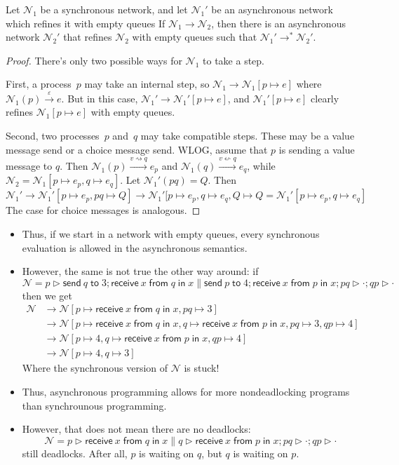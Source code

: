 \documentclass{lecturenotes}
\newcommand{\send}[2]{\ensuremath{\textsf{send}~#1 \mathrel{\textsf{to}} #2}}
\newcommand{\recv}[3]{\ensuremath{\textsf{receive}~#1 \mathrel{\textsf{from}} #2 \mathrel{\textsf{in}} #3}}
\newcommand{\senda}[2]{#1 \rightsquigarrow #2}
\newcommand{\recva}[2]{#1 \leftsquigarrow #2}
\begin{document}
\begin{thm}
  Let $\mathcal{N}_1$ be a synchronous network, and let $\mathcal{N}_1'$ be an asynchronous network which refines it with empty queues
  If $\mathcal{N}_1 \to \mathcal{N}_2$, then there is an asynchronous network $\mathcal{N}_2'$ that refines $\mathcal{N}_2$ with empty queues  such that $\mathcal{N}_1' \to^\ast \mathcal{N}_2'$.
\end{thm}
\begin{proof}
  There's only two possible ways for $\mathcal{N}_1$ to take a step.

  First, a process~$p$ may take an internal step, so $\mathcal{N}_1 \to \mathcal{N}_1[p \mapsto e]$ where $\mathcal{N}_1(p) \xrightarrow{\varepsilon} e$.
  But in this case, $\mathcal{N}_1' \to \mathcal{N}_1'[p \mapsto e]$, and $\mathcal{N}_1'[p \mapsto e]$ clearly refines $\mathcal{N}_1[p \mapsto e]$ with empty queues.

  Second, two processes~$p$ and~$q$ may take compatible steps.
  These may be a value message send or a choice message send.
  WLOG, assume that $p$ is sending a value message to $q$.
  Then $\mathcal{N}_1(p) \xrightarrow{\senda{v}{q}} e_p$ and $\mathcal{N}_1(q) \xrightarrow{\recva{v}{q}} e_q$, while $\mathcal{N}_2 = \mathcal{N}_1[p \mapsto e_p, q \mapsto e_q]$.
  Let $\mathcal{N}_1'(pq) = Q$.
  Then $$\mathcal{N}_1' \to \mathcal{N}_1'[p \mapsto e_p, p q \mapsto Q] \to \mathcal{N}_1'[p \mapsto e_p, q \mapsto e_q, Q \mapsto Q = \mathcal{N}_1'[p \mapsto e_p, q \mapsto e_q]$$
  The case for choice messages is analogous.
\end{proof}

\begin{itemize}
\item Thus, if we start in a network with empty queues, every synchronous evaluation is allowed in the asynchronous semantics.
\item However, the same is not true the other way around: if $$\mathcal{N} = p \triangleright \send{q}{3}; \recv{x}{q}{x} \parallel \send{p}{4}; \recv{x}{p}{x}; pq \triangleright \cdot; qp \triangleright \cdot$$ then we get
  $$\begin{array}{ll}\mathcal{N} &\to \mathcal{N}[p \mapsto \recv{x}{q}{x}, pq \mapsto 3]\\& \to \mathcal{N}[p \mapsto \recv{x}{q}{x}, q \mapsto \recv{x}{p}{x}, pq \mapsto 3, qp \mapsto 4]\\& \to \mathcal{N}[p \mapsto 4, q \mapsto \recv{x}{p}{x}, qp \mapsto 4]\\& \to \mathcal{N}[p \mapsto 4, q \mapsto 3]\end{array}$$
  Where the synchronous version of $\mathcal{N}$ is stuck!
\item Thus, asynchronous programming allows for more nondeadlocking programs than synchrounous programming.
\item However, that does not mean there are no deadlocks:
  $$\mathcal{N} = p \triangleright \recv{x}{q}{x} \parallel q \triangleright \recv{x}{p}{x}; pq \triangleright \cdot; qp \triangleright \cdot$$
  still deadlocks.
  After all, $p$ is waiting on $q$, but $q$ is waiting on $p$.
\end{itemize}
\end{document}
